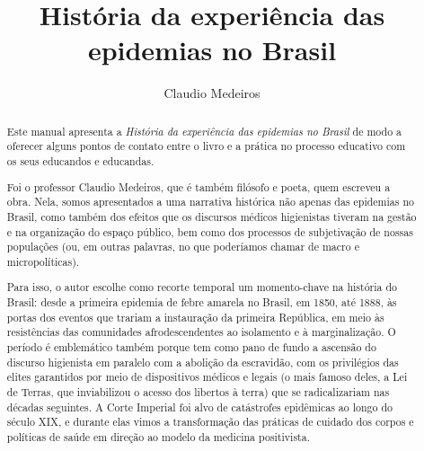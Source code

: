 \documentclass[12pt]{extarticle}
\begin{document}
\newcommand{\AutorLivro}{Claudio Medeiros}
\newcommand{\TituloLivro}{História da experiência das epidemias no Brasil}
\newcommand{\Tema}{Diálogos com a sociologia e com a antropologia}
\newcommand{\Genero}{Narrativa histórica}
\newcommand{\imagemCapa}{./images/PNLD0061-01.png}
\newcommand{\issnppub}{---}
\newcommand{\issnepub}{---}
\newcommand{\colaborador}{\textbf{Rafael Zacca Fernandes}}


\title{\TituloLivro}
\author{\AutorLivro}
\def\authornotes{\colaborador}

\date{}
\maketitle

\begin{abstract}

Este manual apresenta a \emph{História da experiência das epidemias no
Brasil} de modo a oferecer alguns pontos de contato entre o livro e a
prática no processo educativo com os seus educandos e educandas.

Foi o professor Claudio Medeiros, que é também filósofo e poeta, quem
escreveu a obra. Nela, somos apresentados a uma narrativa histórica não
apenas das epidemias no Brasil, como também dos efeitos que os discursos
médicos higienistas tiveram na gestão e na organização do espaço
público, bem como dos processos de subjetivação de nossas populações
(ou, em outras palavras, no que poderíamos chamar de macro e
micropolíticas).

Para isso, o autor escolhe como recorte temporal um momento-chave na
história do Brasil: desde a primeira epidemia de febre amarela no
Brasil, em 1850, até 1888, às portas dos eventos que trariam a
instauração da primeira República, em meio às resistências das
comunidades afrodescendentes ao isolamento e à marginalização. O período
é emblemático também porque tem como pano de fundo a ascensão do
discurso higienista em paralelo com a abolição da escravidão, com os
privilégios das elites garantidos por meio de dispositivos médicos e
legais (o mais famoso deles, a Lei de Terras, que inviabilizou o acesso
dos libertos à terra) que se radicalizariam nas décadas seguintes. A
Corte Imperial foi alvo de catástrofes epidêmicas ao longo do século
XIX, e durante elas vimos a transformação das práticas de cuidado dos
corpos e políticas de saúde em direção ao modelo da medicina
positivista.


\end{abstract}
\end{document}

